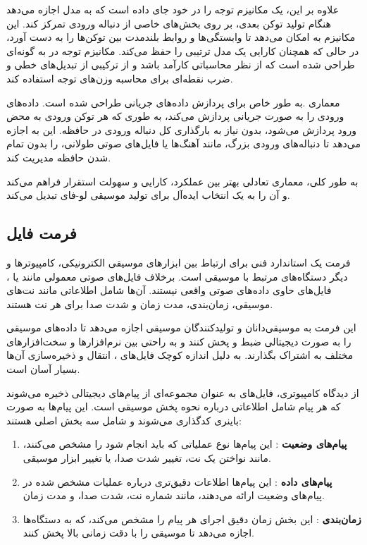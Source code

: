 علاوه بر این،  یک مکانیزم توجه  را در خود جای داده است که به مدل اجازه می‌دهد هنگام تولید توکن بعدی، بر روی بخش‌های خاصی از دنباله ورودی تمرکز کند. این مکانیزم به  امکان می‌دهد تا وابستگی‌ها و روابط بلندمدت بین توکن‌ها را به دست آورد، در حالی که همچنان کارایی یک مدل ترتیبی را حفظ می‌کند. مکانیزم توجه در  به گونه‌ای طراحی شده است که از نظر محاسباتی کارآمد باشد و از ترکیبی از تبدیل‌های خطی و ضرب نقطه‌ای برای محاسبه وزن‌های توجه استفاده کند.

معماری  .به طور خاص برای پردازش داده‌های جریانی طراحی شده است.  داده‌های ورودی را به صورت جریانی پردازش می‌کند، به طوری که هر توکن ورودی به محض ورود پردازش می‌شود، بدون نیاز به بارگذاری کل دنباله ورودی در حافظه. این به  اجازه می‌دهد تا دنباله‌های ورودی بزرگ، مانند آهنگ‌ها یا فایل‌های صوتی طولانی، را بدون تمام شدن حافظه مدیریت کند.

به طور کلی، معماری  تعادلی بهتر بین عملکرد، کارایی و سهولت استقرار فراهم می‌کند و آن را به یک انتخاب ایده‌آل برای تولید موسیقی لو-فای تبدیل می‌کند.


\subsection{فرمت فایل }

فرمت   \cite{de2017understanding} یک استاندارد فنی برای ارتباط بین ابزارهای موسیقی الکترونیکی، کامپیوترها و دیگر دستگاه‌های مرتبط با موسیقی است. برخلاف فایل‌های صوتی معمولی مانند  یا ، فایل‌های  حاوی داده‌های صوتی واقعی نیستند. آن‌ها شامل اطلاعاتی مانند نت‌های موسیقی، زمان‌بندی، مدت زمان و شدت صدا برای هر نت هستند.

این فرمت به موسیقی‌دانان و تولیدکنندگان موسیقی اجازه می‌دهد تا داده‌های موسیقی را به صورت دیجیتالی ضبط و پخش کنند و به راحتی بین نرم‌افزارها و سخت‌افزارهای مختلف به اشتراک بگذارند. به دلیل اندازه کوچک فایل‌های ، انتقال و ذخیره‌سازی آن‌ها بسیار آسان است.

از دیدگاه کامپیوتری، فایل‌های  به عنوان مجموعه‌ای از پیام‌های دیجیتالی ذخیره می‌شوند که هر پیام شامل اطلاعاتی درباره نحوه پخش موسیقی است. این پیام‌ها به صورت باینری کدگذاری می‌شوند و شامل سه بخش اصلی هستند:

\begin{enumerate}
      \def\labelenumi{\arabic{enumi}.}
      \item
            \textbf{پیام‌های وضعیت }: این پیام‌ها نوع عملیاتی که
            باید انجام شود را مشخص می‌کنند، مانند نواختن یک نت، تغییر شدت صدا، یا
            تغییر ابزار موسیقی.
      \item
            \textbf{پیام‌های داده }: این پیام‌ها اطلاعات دقیق‌تری
            درباره عملیات مشخص شده در پیام‌های وضعیت ارائه می‌دهند، مانند شماره نت،
            شدت صدا، و مدت زمان.
      \item
            \textbf{زمان‌بندی }: این بخش زمان دقیق اجرای هر پیام را مشخص
            می‌کند، که به دستگاه‌ها اجازه می‌دهد تا موسیقی را با دقت زمانی بالا پخش
            کنند.
\end{enumerate}

